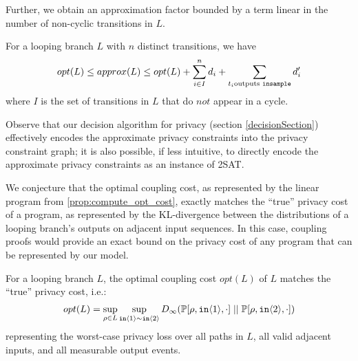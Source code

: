 Further, we obtain an approximation factor bounded by a term linear in the number of non-cyclic transitions in $L$. 

\begin{prop}
    \label{prop:approx_opt_are_close}
    For a looping branch $L$ with $n$ distinct transitions, we have 
    \[opt(L) \leq approx(L) \leq opt(L) + \sum_{i \in I }^n d_i + \sum_{t_i \text{outputs \texttt{insample}}} d_i'\]
    where $I$ is the set of transitions in $L$ that do $\textit{not}$ appear in a cycle.
\end{prop}

Observe that our decision algorithm for privacy (section \ref{decisionSection}) effectively encodes the approximate privacy constraints into the privacy constraint graph; it is also possible, if less intuitive, to directly encode the approximate privacy constraints as an instance of 2SAT. 


We conjecture that the optimal coupling cost, as represented by the linear program from \ref{prop:compute_opt_cost}, exactly matches the ``true'' privacy cost of a program, as represented by the KL-divergence between the distributions of a looping branch's outputs on adjacent input sequences. In this case, coupling proofs would provide an exact bound on the privacy cost of any program that can be represented by our model. 

\begin{conj}
    For a looping branch $L$, the optimal coupling cost $opt(L)$ of $L$ matches the ``true'' privacy cost, i.e.:
    \begin{align*}
        opt(L) = \sup_{\rho \in L} \sup_{\texttt{in}\langle1 \rangle \sim \texttt{in}\langle2 \rangle} D_\infty(\mathbb{P}[\rho, \texttt{in}\langle1 \rangle, \cdot]\; ||\; \mathbb{P}[\rho, \texttt{in}\langle2 \rangle, \cdot])
    \end{align*}
    representing the worst-case privacy loss over all paths in $L$, all valid adjacent inputs, and all measurable output events.
\end{conj}
